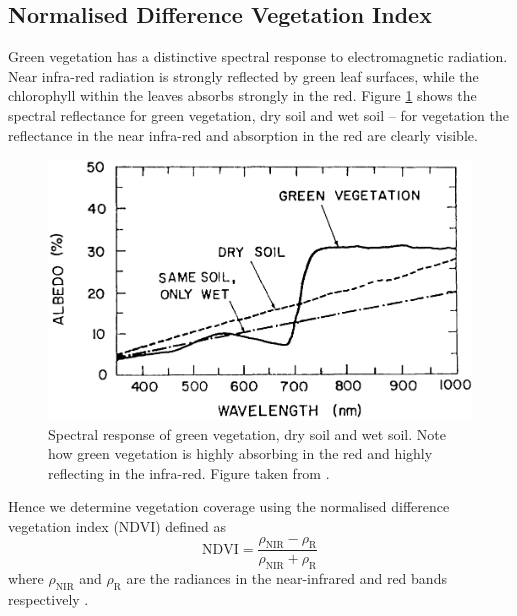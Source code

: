 \subsection{Normalised Difference Vegetation Index}
\label{sec:intro:ndvi}
Green vegetation has a distinctive spectral response to electromagnetic
radiation. Near infra-red radiation is strongly reflected by green leaf
surfaces, while the chlorophyll within the leaves absorbs strongly in the
red. Figure \ref{fig:leaf_spec} shows the spectral reflectance for green
vegetation, dry soil and wet soil -- for vegetation the reflectance in the near
infra-red and absorption in the red are clearly visible.
\begin{figure}
  \centering
  \includegraphics[width=0.9\linewidth]{figures/leaf_spec}
  \caption{Spectral response of green vegetation, dry soil and wet soil. Note how green vegetation is highly absorbing in the red and highly reflecting in the infra-red. Figure taken from \cite{tucker1977}.}
  \label{fig:leaf_spec}
\end{figure}
Hence we determine vegetation coverage using the normalised difference
vegetation index (NDVI) defined as
\begin{equation}
  \mathrm{NDVI} = \frac{\rho_{\mathrm{NIR}}-\rho_{\mathrm{R}}}{\rho_{\mathrm{NIR}}+\rho_{\mathrm{R}}}
  \label{eq:ndvi}
\end{equation}
where $\rho_{\mathrm{NIR}}$ and $\rho_{\mathrm{R}}$ are the radiances in the
near-infrared and red bands respectively \citep{tucker1979}.

